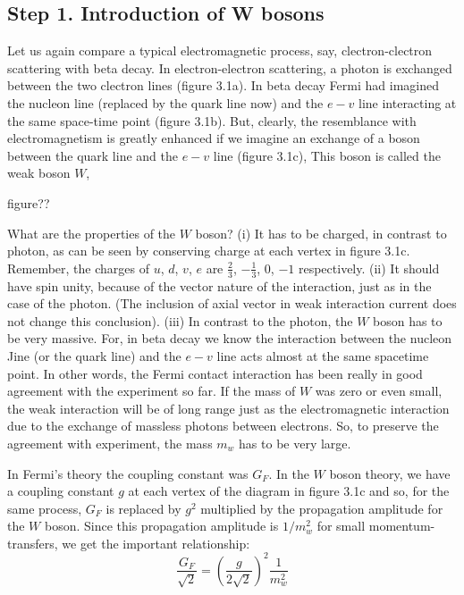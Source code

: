 \subsection*{Step 1. Introduction of W bosons}

Let us again compare a typical electromagnetic process, say, clectron-clectron scattering with beta
decay. In electron-electron scattering, a photon is exchanged between the two clectron lines (figure
3.1a). In beta decay Fermi had imagined the nucleon line (replaced by the quark line now) and
the $e-v$ line interacting at the same space-time point (figure 3.1b). But, clearly, the resemblance
with electromagnetism is greatly enhanced if we imagine an exchange of a boson between the quark
line and the $e-v$ line (figure 3.1c), This boson is called the weak boson $W$,

figure??

What are the properties of the $W$ boson? (i) It has to be charged, in contrast to photon, as can
be seen by conserving charge at each vertex in figure 3.1c. Remember, the charges of $u$, $d$, $v$, $e$
are $\frac{2}{3}$, $-\frac{1}{3}$, $0$, $-1$ respectively. (ii) It should have spin unity, because of the vector nature of the interaction, just as in the case of the photon. (The inclusion of axial vector in weak interaction current
does not change this conclusion). (iii) In contrast to the photon, the $W$ boson has to be very
massive. For, in beta decay we know the interaction between the nucleon Jine (or the quark line) and the $e-v$ line acts almost at the same spacetime point. In other words, the Fermi contact
interaction has been really in good agreement with the experiment so far. If the mass of $W$ was
zero or even small, the weak interaction will be of long range just as the electromagnetic interaction
due to the exchange of massless photons between electrons. So, to preserve the agreement with
experiment, the mass $m_{w}$ has to be very large.

In Fermi’s theory the coupling constant was $G_{F}$. In the $W$ boson theory, we have a coupling
constant $g$ at each vertex of the diagram in figure 3.1c and so, for the same process, $G_{F}$ is replaced
by $g^{2}$ multiplied by the propagation amplitude for the $W$ boson. Since this propagation amplitude
is $1/m^{2}_{w}$ for small momentum-transfers, we get the important relationship:  
\begin{equation*}
\frac{G_{F}}{\sqrt{2}} = \left(\frac{g}{2\sqrt{2}}\right)^{2} \frac{1}{m^{2}_{w}}\tag{3.1}
\end{equation*}

